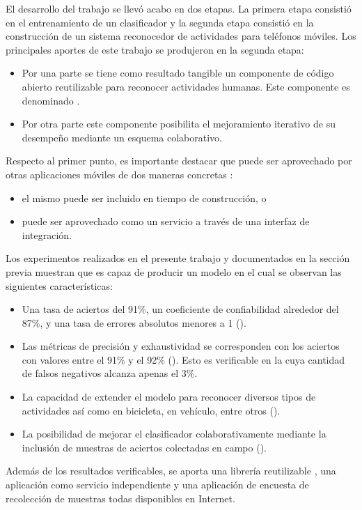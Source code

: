 El desarrollo del trabajo se llevó acabo en dos etapas. La primera
etapa consistió en el entrenamiento de un clasificador y la segunda
etapa consistió en la construcción de un sistema reconocedor de actividades
para teléfonos móviles. Los principales aportes de este trabajo se
produjeron en la segunda etapa:
\begin{itemize}
\item Por una parte se tiene como resultado tangible un componente de código
abierto reutilizable para reconocer actividades humanas. Este componente
es denominado \emph{}.
\item Por otra parte este componente posibilita el mejoramiento iterativo
de su desempeño mediante un esquema colaborativo.
\end{itemize}
Respecto al primer punto, es importante destacar que \emph{}
puede ser aprovechado por otras aplicaciones móviles de dos maneras
concretas \cite{GimenezYegros2016c}: 
\begin{itemize}
\item el mismo puede ser incluido en tiempo de construcción, o
\item puede ser aprovechado como un servicio a través de una interfaz de
integración.
\end{itemize}
Los experimentos realizados en el presente trabajo y documentados
en la sección previa muestran que \emph{} es capaz
de producir un modelo en el cual se observan las siguientes características:
\begin{itemize}
\item Una tasa de aciertos del 91\%, un coeficiente de confiabilidad alrededor
del 87\%, y una tasa de errores absolutos menores a 1 (). 
\item Las métricas de precisión y exhaustividad se corresponden con los
aciertos con valores entre el 91\% y el 92\% ().
Esto es verificable en la  cuya cantidad
de falsos negativos alcanza apenas el 3\%. 
\item La capacidad de extender el modelo para reconocer diversos tipos de
actividades así como en bicicleta, en vehículo, entre otros ().
\item La posibilidad de mejorar el clasificador colaborativamente mediante
la inclusión de muestras de aciertos colectadas en campo ().
\end{itemize}
Además de los resultados verificables, se aporta una librería reutilizable
\cite{GimenezYegros2016d}, una aplicación como servicio independiente
\cite{GimenezYegros2016a} y una aplicación de encuesta de recolección
de muestras \cite{GimenezYegros2016e} todas disponibles en Internet.

